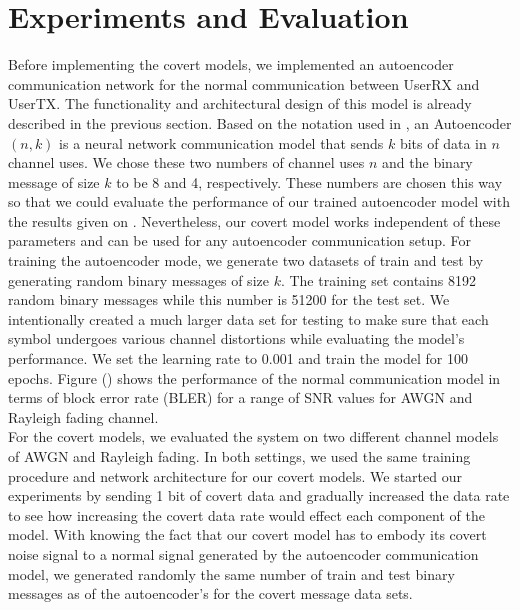 \section{Experiments and Evaluation}
\label{s:eval}
Before implementing the covert models, we implemented an autoencoder communication network for the normal communication between UserRX and UserTX. The functionality and architectural design of this model is already described in the previous section. Based on the notation used in \cite{o2017introduction}, an Autoencoder \((n, k)\) is a neural network communication model that sends \(k\) bits of data in \(n\) channel uses. We chose these two numbers of channel uses \(n\) and the binary message of size \(k\) to be 8 and 4, respectively. These numbers are chosen this way so that we could evaluate the performance of our trained autoencoder model with the results given on \cite{o2017introduction}. Nevertheless, our covert model works independent of these parameters and can be used for any autoencoder communication setup. For training the autoencoder mode, we generate two datasets of train and test by generating random binary messages of size \(k\). The training set contains 8192 random binary messages while this number is 51200 for the test set. We intentionally created a much larger data set for testing to make sure that each symbol undergoes various channel distortions while evaluating the model's performance. We set the learning rate to 0.001 and train the model for 100 epochs. Figure () shows the performance of the normal communication model in terms of block error rate (BLER) for a range of SNR values for AWGN and Rayleigh fading channel.\\
For the covert models, we evaluated the system on two different channel models of AWGN and Rayleigh fading. In both settings, we used the same training procedure and network architecture for our covert models. We started our experiments by sending 1 bit of covert data and gradually increased the data rate to see how increasing the covert data rate would effect each component of the model. With knowing the fact that our covert model has to embody its covert noise signal to a normal signal generated by the autoencoder communication model, we generated randomly the same number of train and test binary messages as of the autoencoder's for the covert message data sets.
